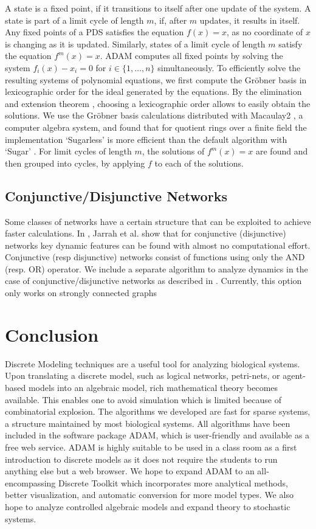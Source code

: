 \documentclass[11pt]{amsart}
\begin{document}
A state is a fixed point, if it transitions to itself after one update of the
system. A state is part of a limit cycle of length $m$, if,
after $m$ updates, it results in itself. Any fixed points of a PDS satisfies
the equation $f(x) = x$, as no coordinate of $x$ is changing as it is updated. 
Similarly, states of a
limit cycle of length $m$ satisfy the equation $f^m(x) = x$. ADAM computes all
fixed points by solving the system $f_i(x) - x_i = 0$ for $i \in \{1, \ldots,
n\}$ simultaneously. To efficiently solve the resulting systems of polynomial
equations, we first compute the Gr\"obner
basis in lexicographic order for the ideal generated by the equations.
By the elimination and extension theorem \cite{IVA}, choosing a lexicographic order
allows to easily obtain the solutions.
We use the Gr\"obner basis calculations distributed with Macaulay2 \cite{Macaulay2}, a
computer algebra system, and found that for quotient rings over a finite field
the implementation `Sugarless' is more efficient than the default algorithm
with `Sugar' \cite{Sugar:1991}. 
For limit cycles of length $m$, the solutions of $f^m(x)=x$ are found and then
grouped into cycles, by applying $f$ to each of the solutions. 

\subsection{Conjunctive/Disjunctive Networks}
Some classes of networks have a certain structure that can be
exploited to achieve faster calculations. In \cite{conjunctive}, Jarrah et al.
show that for conjunctive (disjunctive) networks key dynamic features can be found with
almost no computational effort. Conjunctive (resp disjunctive) networks consist of
functions using only the AND (resp. OR) operator. 
We include a separate algorithm to analyze 
dynamics in the case of conjunctive/disjunctive networks as described in
\cite{conjunctive}. Currently,
this option only works on strongly connected graphs


\section{Conclusion}
Discrete Modeling techniques are a useful tool for analyzing biological
systems. Upon translating a discrete model, such as logical networks,
petri-nets, or agent-based models into an algebraic model, rich mathematical
theory becomes available. This enables one to
avoid simulation which is limited because of combinatorial explosion. The algorithms 
we developed are fast for sparse systems, a structure maintained by most biological
systems. All algorithms have been included in the software package ADAM\cite{ADAM}, 
which is user-friendly and available as a free web service. 
ADAM is highly suitable to be used in a class room as a first
introduction to discrete models as it does not require the students to run
anything else but a web browser.
We hope to expand ADAM to an all-encompassing Discrete Toolkit which incorporates more 
analytical methods, better visualization, and automatic conversion for more model types. 
We also hope to analyze controlled algebraic models and expand theory to stochastic systems. 
\end{document}
